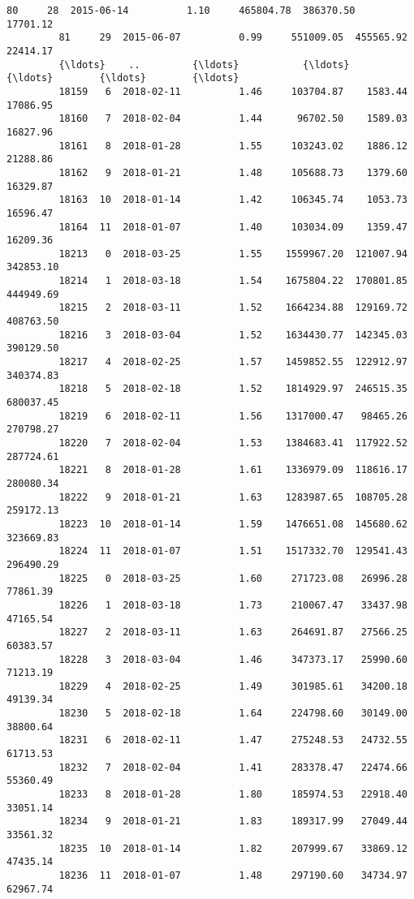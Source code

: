 \documentclass[11pt]{article}
\begin{document}
\begin{Verbatim}[commandchars=\\\{\}]
         80     28  2015-06-14          1.10     465804.78  386370.50   17701.12   
         81     29  2015-06-07          0.99     551009.05  455565.92   22414.17   
         {\ldots}    ..         {\ldots}           {\ldots}           {\ldots}        {\ldots}        {\ldots}   
         18159   6  2018-02-11          1.46     103704.87    1583.44   17086.95   
         18160   7  2018-02-04          1.44      96702.50    1589.03   16827.96   
         18161   8  2018-01-28          1.55     103243.02    1886.12   21288.86   
         18162   9  2018-01-21          1.48     105688.73    1379.60   16329.87   
         18163  10  2018-01-14          1.42     106345.74    1053.73   16596.47   
         18164  11  2018-01-07          1.40     103034.09    1359.47   16209.36   
         18213   0  2018-03-25          1.55    1559967.20  121007.94  342853.10   
         18214   1  2018-03-18          1.54    1675804.22  170801.85  444949.69   
         18215   2  2018-03-11          1.52    1664234.88  129169.72  408763.50   
         18216   3  2018-03-04          1.52    1634430.77  142345.03  390129.50   
         18217   4  2018-02-25          1.57    1459852.55  122912.97  340374.83   
         18218   5  2018-02-18          1.52    1814929.97  246515.35  680037.45   
         18219   6  2018-02-11          1.56    1317000.47   98465.26  270798.27   
         18220   7  2018-02-04          1.53    1384683.41  117922.52  287724.61   
         18221   8  2018-01-28          1.61    1336979.09  118616.17  280080.34   
         18222   9  2018-01-21          1.63    1283987.65  108705.28  259172.13   
         18223  10  2018-01-14          1.59    1476651.08  145680.62  323669.83   
         18224  11  2018-01-07          1.51    1517332.70  129541.43  296490.29   
         18225   0  2018-03-25          1.60     271723.08   26996.28   77861.39   
         18226   1  2018-03-18          1.73     210067.47   33437.98   47165.54   
         18227   2  2018-03-11          1.63     264691.87   27566.25   60383.57   
         18228   3  2018-03-04          1.46     347373.17   25990.60   71213.19   
         18229   4  2018-02-25          1.49     301985.61   34200.18   49139.34   
         18230   5  2018-02-18          1.64     224798.60   30149.00   38800.64   
         18231   6  2018-02-11          1.47     275248.53   24732.55   61713.53   
         18232   7  2018-02-04          1.41     283378.47   22474.66   55360.49   
         18233   8  2018-01-28          1.80     185974.53   22918.40   33051.14   
         18234   9  2018-01-21          1.83     189317.99   27049.44   33561.32   
         18235  10  2018-01-14          1.82     207999.67   33869.12   47435.14   
         18236  11  2018-01-07          1.48     297190.60   34734.97   62967.74   
         

\end{Verbatim}
\end{document}
